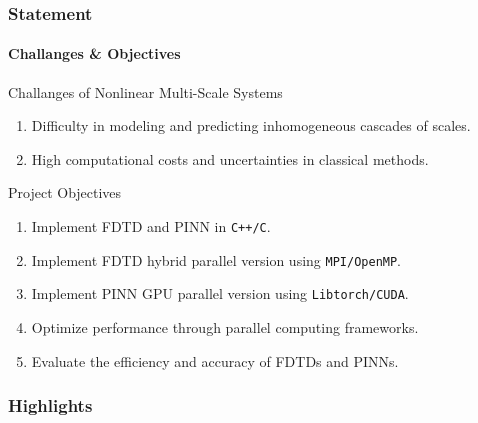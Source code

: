 \begin{frame}
  \frametitle{Statement}
  \framesubtitle{Challanges \& Objectives}
  \begin{block}{Challanges of Nonlinear Multi-Scale Systems}
    \begin{enumerate}
      \item Difficulty in modeling and predicting inhomogeneous cascades of scales.
      \item High computational costs and uncertainties in classical methods.
    \end{enumerate}    
  \end{block}

  \begin{block}{Project Objectives}
    \begin{enumerate}
      \item Implement FDTD and PINN in \texttt{C++/C}.
      \item Implement FDTD hybrid parallel version using \texttt{MPI/OpenMP}.
      \item Implement PINN GPU parallel version using \texttt{Libtorch/CUDA}.
      \item Optimize performance through parallel computing frameworks.
      \item Evaluate the efficiency and accuracy of FDTDs and PINNs.
    \end{enumerate}
  \end{block}
\end{frame}


\begin{frame}
  \frametitle{Highlights}
  
\end{frame}




